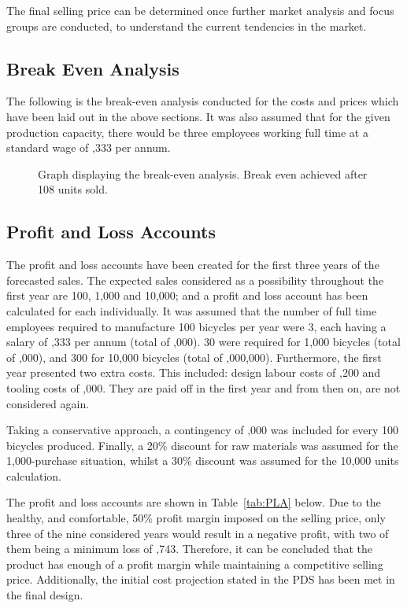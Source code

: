 \documentclass[a4paper,11pt]{article}
\begin{document}
The final selling price can be determined once further market analysis and focus groups are conducted, to understand the current tendencies in the market. 

\subsection{Break Even Analysis}

The following is the break-even analysis conducted for the costs and prices which have been laid out in the above sections. It was also assumed that for the given production capacity, there would be three employees working full time at a standard wage of ,333 per annum.

\begin{figure}[ht]
	\caption{Graph displaying the break-even analysis. Break even achieved after 108 units sold.}
\end{figure}

\subsection{Profit and Loss Accounts}

The profit and loss accounts have been created for the first three years of the forecasted sales. The expected sales considered as a possibility throughout the first year are 100, 1,000 and 10,000; and a profit and loss account has been calculated for each individually. It was assumed that the number of full time employees required to manufacture 100 bicycles per year were 3, each having a salary of ,333 per annum (total of ,000). 30 were required for 1,000 bicycles (total of ,000), and 300 for 10,000 bicycles (total of ,000,000). Furthermore, the first year presented two extra costs. This included: design labour costs of ,200 and tooling costs of ,000. They are paid off in the first year and from then on, are not considered again. 

Taking a conservative approach, a contingency of ,000 was included for every 100 bicycles produced. Finally, a 20\% discount for raw materials was assumed for the 1,000-purchase situation, whilst a 30\% discount was assumed for the 10,000 units calculation. 

The profit and loss accounts are shown in Table~\ref{tab:PLA} below. Due to the healthy, and comfortable, 50\% profit margin imposed on the selling price, only three of the nine considered years would result in a negative profit, with two of them being a minimum loss of ,743. Therefore, it can be concluded that the product has enough of a profit margin while maintaining a competitive selling price. Additionally, the initial cost projection stated in the PDS has been met in the final design.  
\end{document}
